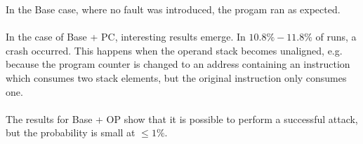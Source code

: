 In the Base case, where no fault was introduced, the progam ran as expected.\\\\
In the case of Base + PC, interesting results emerge. In $10.8\% - 11.8\%$ of runs, a crash occurred. This happens when the operand stack becomes unaligned, e.g. because the program counter is changed to an address containing an instruction which consumes two stack elements, but the original instruction only consumes one.\\\\
The results for Base + OP show that it is possible to perform a successful attack, but the probability is small at $\leq 1\%$.\\\\